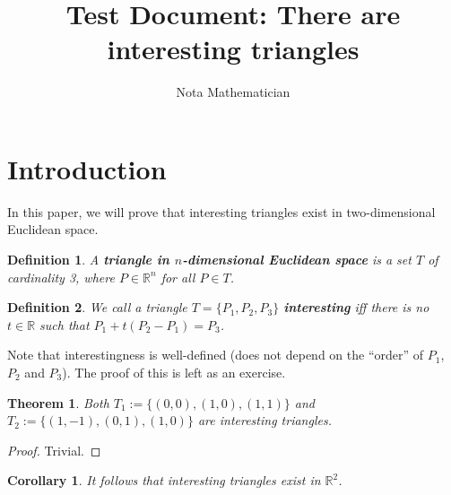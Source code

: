\documentclass{article}
\author{Nota Mathematician}
\title{Test Document: There are interesting triangles}
\newtheorem{definition}{Definition}
\newtheorem{theorem}{Theorem}
\newtheorem{corollary}{Corollary}
\begin{document}
\maketitle
\section{Introduction}
In this paper, we will prove that interesting triangles exist in two-dimensional Euclidean space.

\begin{definition}
    A \textbf{triangle in $n$-dimensional Euclidean space} is a set $T$ of cardinality 3, where $P \in \mathbb{R}^n$ for all $P \in T$.
\end{definition}

\begin{definition}
    We call a triangle $T = \{P_1, P_2, P_3\}$ \textbf{interesting} iff there is no $t \in \mathbb{R}$ such that $P_1 + t (P_2-P_1) = P_3$.
\end{definition}

Note that interestingness is well-defined (does not depend on the ``order'' of $P_1$, $P_2$ and $P_3$).
The proof of this is left as an exercise.

\begin{theorem}
    Both $T_1 := \{(0, 0), (1, 0), (1, 1)\}$ and $T_2 := \{(1, -1), (0, 1), (1, 0)\}$ are interesting triangles.
\end{theorem}

\begin{proof}
    Trivial.
\end{proof}

\begin{corollary}
    It follows that interesting triangles exist in $\mathbb{R}^2$.
\end{corollary}
\end{document}
